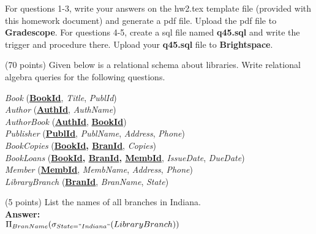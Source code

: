 For questions 1-3, write your answers on the hw2.tex template file (provided with this homework document) and generate a pdf file. Upload the pdf file to \textbf{Gradescope}. For questions 4-5, create a sql file named \textbf{q45.sql} and write the trigger and procedure there. Upload your \textbf{q45.sql} file to \textbf{Brightspace}.\\

\begin{questions}

\question (70 points) Given below is a relational schema about libraries. Write relational algebra queries for the following questions.\\

\begin{addmargin}[1em]{2em}%

    \textit{Book} (\textbf{\underline{BookId}},  \textit{Title}, \textit{PublId})\\
    \textit{Author} (\textbf{\underline{AuthId}}, \textit{AuthName})\\
    \textit{AuthorBook} (\textbf{\underline{AuthId}}, \textbf{\underline{BookId}})\\
    \textit{Publisher} (\textbf{\underline{PublId}}, \textit{PublName}, \textit{Address}, \textit{Phone})\\
    \textit{BookCopies} (\textbf{\underline{BookId}, \underline{BranId}}, \textit{Copies})\\
    \textit{BookLoans} (\textbf{\underline{BookId}, \underline{BranId}, \underline{MembId}}, \textit{IssueDate}, \textit{DueDate})\\
    \textit{Member} (\textbf{\underline{MembId}},  \textit{MembName}, \textit{Address}, \textit{Phone})\\
    \textit{LibraryBranch} (\textbf{\underline{BranId}}, \textit{BranName}, \textit{State})\\
    
\end{addmargin}

\begin{choices}

	\choice(5 points) List the names of all branches in Indiana.\\
    \textbf{Answer:} \\
	$\Pi_{BranName}(\sigma_{State = "Indiana"} (LibraryBranch))$
	\vspace{50 mm}
	

\end{choices}
\end{questions}
